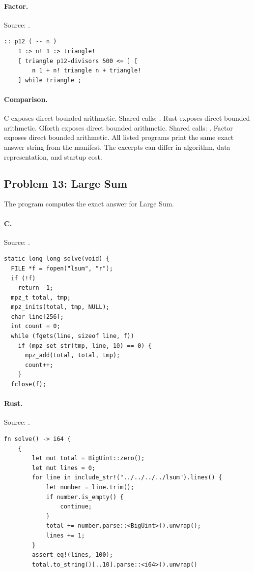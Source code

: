 \paragraph{Factor.} Source: .
\begin{lstlisting}
:: p12 ( -- n )
    1 :> n! 1 :> triangle!
    [ triangle p12-divisors 500 <= ] [
        n 1 + n! triangle n + triangle!
    ] while triangle ;
\end{lstlisting}

\paragraph{Comparison.}
C exposes direct bounded arithmetic. Shared calls: \texttt{}. Rust exposes direct bounded arithmetic. Gforth exposes direct bounded arithmetic. Shared calls: \texttt{}. Factor exposes direct bounded arithmetic.
All listed programs print the same exact answer string from the manifest. The excerpts can differ in algorithm, data representation, and startup cost.

\subsection{Problem 13: Large Sum}
\label{walkthrough:p13}
The program computes the exact answer for Large Sum.

\paragraph{C.} Source: .
\begin{lstlisting}
static long long solve(void) {
  FILE *f = fopen("lsum", "r");
  if (!f)
    return -1;
  mpz_t total, tmp;
  mpz_inits(total, tmp, NULL);
  char line[256];
  int count = 0;
  while (fgets(line, sizeof line, f))
    if (mpz_set_str(tmp, line, 10) == 0) {
      mpz_add(total, total, tmp);
      count++;
    }
  fclose(f);
\end{lstlisting}

\paragraph{Rust.} Source: .
\begin{lstlisting}
fn solve() -> i64 {
    {
        let mut total = BigUint::zero();
        let mut lines = 0;
        for line in include_str!("../../../../lsum").lines() {
            let number = line.trim();
            if number.is_empty() {
                continue;
            }
            total += number.parse::<BigUint>().unwrap();
            lines += 1;
        }
        assert_eq!(lines, 100);
        total.to_string()[..10].parse::<i64>().unwrap()
\end{lstlisting}

